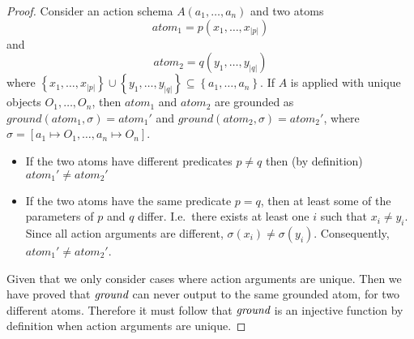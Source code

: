 \documentclass[../Master.tex]{subfiles}
\begin{document}
\begin{proof}
    Consider an action schema $A\left(a_1, \dots, a_n\right)$ and two atoms 
    \begin{equation*}
        atom_1 = p\left(x_1, \dots, x_{|p|}\right)
    \end{equation*}
    and
    \begin{equation*}
       atom_2 = q\left(y_1, \dots, y_{|q|}\right)
    \end{equation*}
    where $\left\{ x_1, \dots, x_{|p|}\right\} \cup \left\{ y_1, \dots, y_{|q|}\right\} \subseteq \left\{a_1, \dots, a_n\right\}$. If $A$ is applied with unique objects $O_1, \dots, O_n$, 
    then $atom_1$ and $atom_2$ are grounded as $ground(atom_1, \sigma) = atom_1'$ and $ground(atom_2,\sigma) = atom_2'$, where $\sigma = \left[ a_1 \mapsto O_1, \dots, a_n \mapsto O_n \right]$.

	\begin{itemize}
		\item If the two atoms have different predicates $p \neq q$ then (by definition) $atom_1' \neq atom_2'$
		
        \item If the two atoms have the same predicate $p = q$, then at least some of the parameters of $p$ and $q$ differ. I.e.\ there exists at least one $i$ such that $x_i \neq y_i$. Since all action arguments are different, $\sigma\left( x_i \right) \neq \sigma\left( y_i \right)$. Consequently, $atom_1' \neq atom_2'$.
	\end{itemize}	
	Given that we only consider cases where action arguments are unique. 
	Then we have proved that $\textit{ground}$ can never output to the same grounded atom, for two different atoms. Therefore it must follow that $\textit{ground}$ is an injective function by definition when action arguments are unique.
\end{proof}
\end{document}

